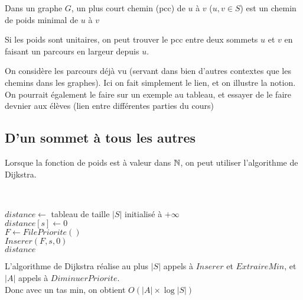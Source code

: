 \begin{definition}
	Dans un graphe $G$, un plus court chemin (pcc) de $u$ à $v$ ($u,v\in S$) est un chemin de poids minimal de $u$ à $v$
\end{definition}

\begin{rem}
	Si les poids sont unitaires, on peut trouver le pcc entre deux sommets $u$ et $v$ en faisant un parcours en largeur depuis $u$.
\end{rem}

\begin{com}
	On considère les parcours déjà vu (servant dans bien d'autres contextes que les chemins dans les graphes). Ici on fait simplement le lien, et on illustre la notion. On pourrait également le faire sur un exemple au tableau, et essayer de le faire devnier aux élèves (lien entre différentes parties du cours)
\end{com}

\subsection{D'un sommet à tous les autres}

Lorsque la fonction de poids est à valeur dans $\mathbb{N}$, on peut utiliser l'algorithme de Dijkstra.

\begin{algo} 
	\enspace \\
	\begin{algorithm}[H]
		\caption{$dijkstra(G, S)$}
		$distance \gets $ tableau de taille $|S|$ initialisé à $+\infty$\\
		$distance[s] \gets 0$\\	
		$F \gets FilePriorite()$\\
		$Inserer(F, s, 0)$\\
		\Retour $distance$
	\end{algorithm}
\end{algo}


\begin{proposition}
	L’algorithme de Dijkstra réalise au plus $|S|$ appels à $Inserer$ et $ExtraireMin$, et $|A|$ appels à $DiminuerPriorite$.\\
	Donc avec un tas min, on obtient $O(|A| \times \log |S|)$
\end{proposition}


